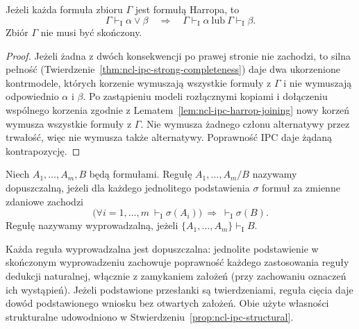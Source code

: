 \begin{twierdzenie}
\label{thm:ncl-ipc-harrop-disjunction}
Jeżeli każda formuła zbioru $\Gamma$ jest formułą
Harropa, to
\[
 \Gamma\vdash_{\mathrm I}\alpha\vee\beta
 \quad\Longrightarrow\quad
 \Gamma\vdash_{\mathrm I}\alpha\ \text{lub}\
 \Gamma\vdash_{\mathrm I}\beta.
\]
Zbiór $\Gamma$ nie musi być skończony.
\end{twierdzenie}
\begin{proof}
Jeżeli żadna z dwóch konsekwencji po prawej stronie
nie zachodzi, to silna pełność
(Twierdzenie~\ref{thm:ncl-ipc-strong-completeness})
daje dwa ukorzenione kontrmodele, których korzenie
wymuszają wszystkie formuły z $\Gamma$ i nie
wymuszają odpowiednio $\alpha$ i $\beta$.
Po zastąpieniu modeli rozłącznymi kopiami
i dołączeniu wspólnego korzenia zgodnie z
Lematem~\ref{lem:ncl-ipc-harrop-joining}
nowy korzeń wymusza wszystkie formuły z $\Gamma$.
Nie wymusza żadnego członu alternatywy przez
trwałość, więc nie wymusza także alternatywy.
Poprawność IPC daje żądaną kontrapozycję.
\end{proof}

\begin{definicja}
\label{def:ncl-ipc-admissible-rule}
Niech $A_1,\ldots,A_m,B$ będą formułami.
Regułę $A_1,\ldots,A_m/B$ nazywamy dopuszczalną,
jeżeli dla każdego jednolitego podstawienia $\sigma$
formuł za zmienne zdaniowe zachodzi
\[
 \bigl(\forall i=1,\ldots,m\
           \vdash_{\mathrm I}\sigma(A_i)\bigr)
 \ \Longrightarrow\ \vdash_{\mathrm I}\sigma(B).
\]
Regułę nazywamy wyprowadzalną, jeżeli
$\{A_1,\ldots,A_m\}\vdash_{\mathrm I}B$.
\end{definicja}
Każda reguła wyprowadzalna jest dopuszczalna:
jednolite podstawienie w skończonym wyprowadzeniu
zachowuje poprawność każdego zastosowania reguły
dedukcji naturalnej, włącznie z zamykaniem założeń
(przy zachowaniu oznaczeń ich wystąpień).
Jeżeli podstawione przesłanki są twierdzeniami,
reguła cięcia daje dowód podstawionego wniosku
bez otwartych założeń. Obie użyte własności
strukturalne udowodniono w
Stwierdzeniu~\ref{prop:ncl-ipc-structural}.

